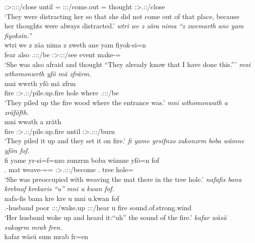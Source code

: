 \begin{exe}
	\Stpl:\Sbj>\Tsg:\Obj:\Io:\Nonpast:\Ipfv/close until {\Dem} \Recog={\Loc} {\Neg} \Sg:\Sbj:\Pst:\Dur/come.out \Recog={\Loc} thought {\Iam} \Stpl:\Sbj>\Tsg.\F:\Io:\Iter/close\\
	\trans `They were distracting her so that she did not come out of that place, because her thoughts were always distracted.'
	\emph{wtri we z zära nima ``z zwemarth ane yam fiyoksin.''}\\
	\gll wtri we z zäa nima z zweth ane yam fiyok-si=n\\
	fear also {\Iam} \Tsg.\F:\Sbj:\Pst:\Ipfv/be {\Quot} {\Iam} \Stpl:\Sbj>\Fsg:\Obj:\Rpst:\Pfv/see {\Dem} event make-\Nmlz=\Loc\\
	\trans `She was also afraid and thought ``They already know that I have done this.'''
	\emph{mni wthomonwrth yfö mä zfrärm.}\\
	\gll mni wwrth yfö mä zfrm\\
	fire \Stpl:\Sbj>\Tsg.\F:\Nonpast:\Ipfv/pile.up.fire hole where \Tsg.\F:\Sbj:\Pst:\Dur/be\\
	\trans `They piled up the fire wood where the entrance was.'
	\emph{mni wthomonwath a zräföfth.}\\
	\gll mni wwath a zräth\\
	fire \Stpl:\Sbj>\Tsg.\F:\Pst:\Ipfv/pile.up.fire until \Stpl:\Sbj>\Tsg.\F:\Obj:\Irr:\Pfv/burn\\
	\trans `They piled it up and they set it on fire.'
	\emph{fi yame yrsifnzo zukonzrm boba wämne yfön fof.}\\
	\gll fi yame yr-si=f=nzo zunzrm boba wämne yfö=n fof\\
	\Third.{\Abs} mat weave-\Nmlz=\Erg={\Only} \Sg:\Sbj>\Tsg.\F:\Obj:\Pst:\Dur/become \Med.{\Abl} tree hole={\Loc} {\Emph}\\
	\trans `She was preoccupied with weaving the mat there in the tree hole.'
	\emph{nafafis bana krebnaf krekaris ``u'' mni u kwan fof.}\\
	\gll nafa-fis bana kre kre u mni {u.kwan} fof\\
	\Third.\Poss-husband poor \Stsg:\Sbj:\Irr:\Pfv/wake.up \Stsg:\Sbj:\Irr:\Pfv/hear u fire {sound.of.strong.wind} \Emph\\
	\trans `Her husband woke up and heard it:``uh'' the sound of the fire.'
	\emph{kafar wäsü sukogrm mrab fren.}\\
	\gll kafar wäsü sum mrab fr=en\\

\end{exe}
